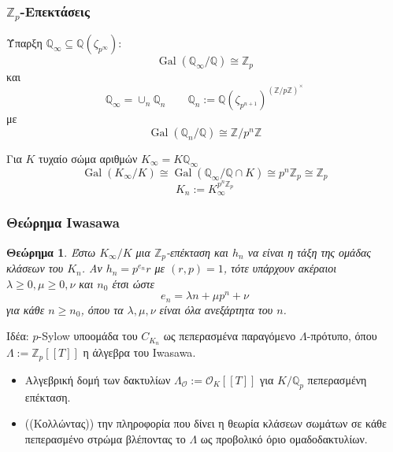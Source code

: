 \documentclass{beamer}
\newcommand {\tl}{\textlatin}
\newcommand{\Gal}{\operatorname{Gal}}
\newcommand{\Q}{\mathbb{Q}}
\newcommand{\Z}{\mathbb{Z}}
\newcommand{\Lo}{\Lambda_{\mathcal{O}}}
\newtheorem{thrm}{Θεώρημα}
\begin{document}



 





\begin{frame}
\frametitle{$\Z_p$-Επεκτάσεις}
\begin{block}{Ύπαρξη}
$\Q_\infty \subseteq \Q(\zeta_{p^\infty})$:
$$\Gal(\Q_\infty/\Q) \cong \Z_p$$ και 
$$\Q_\infty = \cup_n \Q_n \quad \quad \Q_n:= \Q(\zeta_{p^{n+1}})^{(\Z/p\Z)^\times}$$ με 
$$\Gal(\Q_n/\Q) \cong \Z/p^n \Z$$

\pause

Για $K$ τυχαίο σώμα αριθμών $K_\infty = K\Q_\infty$
$$\Gal(K_\infty/K) \cong \Gal(\Q_\infty/\Q\cap K) \cong p^n \Z_p \cong \Z_p$$
$$K_n := K_\infty^{p^n \Z_p}$$
\end{block}
\end{frame}

\begin{frame}
\frametitle{Θεώρημα \tl{Iwasawa}}
\begin{thrm}
Έστω $K_\infty/K$ μια $\Z_p$-επέκταση και $h_n$ να είναι η τάξη της ομάδας κλάσεων του $K_n$. Αν $h_n = p^{e_n}r$ με  $(r,p)=1$, τότε υπάρχουν 
	ακέραιοι $\lambda \geq 0, \mu \geq 0, \nu$ και $n_0$ έτσι ώστε
	$$e_n = \lambda n + \mu p^n + \nu$$ για κάθε $n\geq n_0$, όπου τα $\lambda,\mu,\nu$ είναι όλα ανεξάρτητα του $n$. 
\end{thrm}

\pause

Ιδέα: $p$-\tl{Sylow} υποομάδα του $C_{K_n}$ ως πεπερασμένα παραγόμενο $\Lambda$-πρότυπο, όπου $\Lambda := \Z_p[[T]]$ η άλγεβρα του \tl{Iwasawa}.
\begin{itemize}
\item Αλγεβρική δομή των δακτυλίων $\Lo := \mathcal{O}_K[[T]]$ για $K/\Q_p$ πεπερασμένη επέκταση.
\item ((Κολλώντας)) την πληροφορία που δίνει η θεωρία κλάσεων σωμάτων σε κάθε πεπερασμένο στρώμα βλέποντας το $\Lambda$ ως προβολικό όριο ομαδοδακτυλίων.
\end{itemize}
\end{frame}
\end{document}
